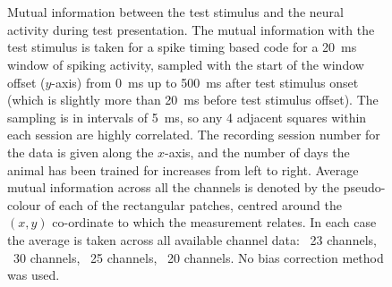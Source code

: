 \begin{figure}[htbp]%
    \centering
    ~~
    \\
    ~~
    \caption{Mutual information between the test stimulus and the neural activity during test presentation.
The mutual information with the test stimulus is taken for a spike timing based code for a \SI{20}{ms} window of spiking activity, sampled with the start of the window offset ($y$-axis) from \SI{0}{ms} up to \SI{500}{ms} after test stimulus onset (which is slightly more than \SI{20}{ms} before test stimulus offset).
The sampling is in intervals of \SI{5}{ms}, so any 4 adjacent squares within each session are highly correlated.
The recording session number for the data is given along the $x$-axis, and the number of days the animal has been trained for increases from left to right.
Average mutual information across all the channels is denoted by the pseudo-colour of each of the rectangular patches, centred around the $(x,y)$ co-ordinate to which the measurement relates.
In each case the average is taken across all available channel data: \protect{}~23 channels, \protect{}~30 channels, \protect{}~25 channels, \protect{}~20 channels.
No bias correction method was used.
}
    \label{fig:sess}
\end{figure}


